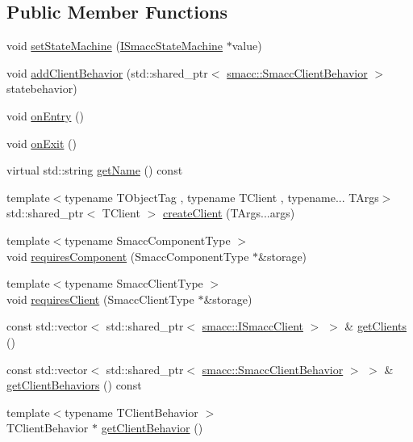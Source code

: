 \subsection*{Public Member Functions}
\begin{DoxyCompactItemize}
\item 
void \hyperlink{classsmacc_1_1Orthogonal_a05f65c01344a6c8593f7f88c0ca19654}{set\+State\+Machine} (\hyperlink{classsmacc_1_1ISmaccStateMachine}{I\+Smacc\+State\+Machine} $\ast$value)
\item 
void \hyperlink{classsmacc_1_1Orthogonal_a729460fd4ac0ecc24cc89623e6f5c0b5}{add\+Client\+Behavior} (std\+::shared\+\_\+ptr$<$ \hyperlink{classsmacc_1_1SmaccClientBehavior}{smacc\+::\+Smacc\+Client\+Behavior} $>$ statebehavior)
\item 
void \hyperlink{classsmacc_1_1Orthogonal_a77888104f276bdbd177d69cf23f11a56}{on\+Entry} ()
\item 
void \hyperlink{classsmacc_1_1Orthogonal_a71c0df3d9e8327e65286e1ce0a3a7043}{on\+Exit} ()
\item 
virtual std\+::string \hyperlink{classsmacc_1_1Orthogonal_ae1ad57a2fda4d7f2ecf708c342fc1bb9}{get\+Name} () const 
\item 
{\footnotesize template$<$typename T\+Object\+Tag , typename T\+Client , typename... T\+Args$>$ }\\std\+::shared\+\_\+ptr$<$ T\+Client $>$ \hyperlink{classsmacc_1_1Orthogonal_a8676cb5a7fe77d5ba1ddca2c2f4946df}{create\+Client} (T\+Args...\+args)
\item 
{\footnotesize template$<$typename Smacc\+Component\+Type $>$ }\\void \hyperlink{classsmacc_1_1Orthogonal_a433bda80701bebd5d801685d31b08115}{requires\+Component} (Smacc\+Component\+Type $\ast$\&storage)
\item 
{\footnotesize template$<$typename Smacc\+Client\+Type $>$ }\\void \hyperlink{classsmacc_1_1Orthogonal_abcde9f489cdf94acca381ea67649a723}{requires\+Client} (Smacc\+Client\+Type $\ast$\&storage)
\item 
const std\+::vector$<$ std\+::shared\+\_\+ptr$<$ \hyperlink{classsmacc_1_1ISmaccClient}{smacc\+::\+I\+Smacc\+Client} $>$ $>$ \& \hyperlink{classsmacc_1_1Orthogonal_aee5bcdacccdc3450785983fe58e11d1b}{get\+Clients} ()
\item 
const std\+::vector$<$ std\+::shared\+\_\+ptr$<$ \hyperlink{classsmacc_1_1SmaccClientBehavior}{smacc\+::\+Smacc\+Client\+Behavior} $>$ $>$ \& \hyperlink{classsmacc_1_1Orthogonal_a9c0939a24078adfb96c4c1d198cea038}{get\+Client\+Behaviors} () const 
\item 
{\footnotesize template$<$typename T\+Client\+Behavior $>$ }\\T\+Client\+Behavior $\ast$ \hyperlink{classsmacc_1_1Orthogonal_a6d2e8ebac0d6679f876ab5a31ad58bbe}{get\+Client\+Behavior} ()
\end{DoxyCompactItemize}
